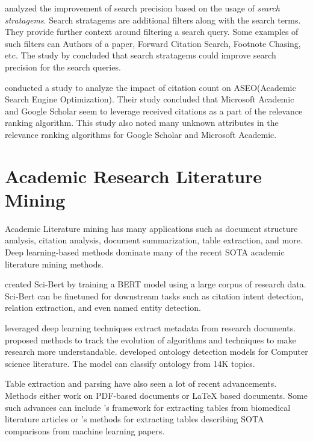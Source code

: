 \cite{kacem2018analysis} analyzed the improvement of search precision based on the usage of \textit{search stratagems}.
Search stratagems are additional filters along with the search terms. They provide further context around filtering a search query. 
Some examples of such filters can Authors of a paper, Forward Citation Search, Footnote Chasing, etc.
The study by \cite{kacem2018analysis} concluded that search stratagems could improve search precision for the search queries.

\cite{rovira2019ranking} conducted a study to analyze the impact of citation count on ASEO(Academic Search Engine Optimization). 
Their study concluded that Microsoft Academic and Google Scholar seem to leverage received citations as a part of the relevance 
ranking algorithm. This study also noted many unknown attributes in the relevance ranking algorithms for Google Scholar and Microsoft Academic.


\section{Academic Research Literature Mining}
\label{relatedwork:acad-lit-mining}
Academic Literature mining has many applications such as document structure analysis, citation analysis, document summarization, table extraction, and more. Deep learning-based methods dominate many of the recent SOTA academic literature mining methods. 

\cite{beltagy2019scibert} created Sci-Bert by training a BERT model \parencite{devlin2018bert} using a large corpus of research data. Sci-Bert can be finetuned for downstream tasks such as citation intent detection, relation extraction, and even named entity detection. 
 
\cite{safder2020deep} leveraged deep learning techniques extract metadata from research documents. \cite{zha2019mining} proposed methods to track the evolution of algorithms and techniques to make research more understandable. \cite{salatino2020ontology} developed ontology detection models for Computer science literature. The model can classify ontology from 14K topics.

Table extraction and parsing have also seen a lot of recent advancements. Methods either work on PDF-based documents or LaTeX based documents.  Some such advances can include \cite{milosevic2019framework}'s framework for extracting tables from biomedical literature articles or \cite{kardas2020axcell}'s methods for extracting tables describing SOTA comparisons from machine learning papers. 

